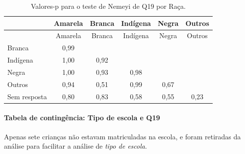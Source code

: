 \documentclass[]{article}
\let\oldparagraph\paragraph
\renewcommand{\paragraph}[1]{\oldparagraph{#1}\mbox{}}
\begin{document}
\begin{longtable}[]{@{}lccccc@{}}
\caption{\label{tab:unnamed-chunk-346}Valores-p para o teste de Nemeyi de Q19 por Raça.}\tabularnewline
\toprule
& Amarela & Branca & Indígena & Negra & Outros\tabularnewline
\midrule
\endfirsthead
\toprule
& Amarela & Branca & Indígena & Negra & Outros\tabularnewline
\midrule
\endhead
Branca & 0,99 & & & &\tabularnewline
Indígena & 1,00 & 0,92 & & &\tabularnewline
Negra & 1,00 & 0,93 & 0,98 & &\tabularnewline
Outros & 0,94 & 0,51 & 0,99 & 0,67 &\tabularnewline
Sem resposta & 0,80 & 0,83 & 0,58 & 0,55 & 0,23\tabularnewline
\bottomrule
\end{longtable}

\cleardoublepage

\hypertarget{tabela-de-continguxeancia-tipo-de-escola-e-q19}{%
\paragraph{Tabela de contingência: Tipo de escola e Q19}\label{tabela-de-continguxeancia-tipo-de-escola-e-q19}}

Apenas sete crianças não estavam matriculadas na escola, e foram retiradas da análise para facilitar a análise de \emph{tipo de escola}.
\end{document}
